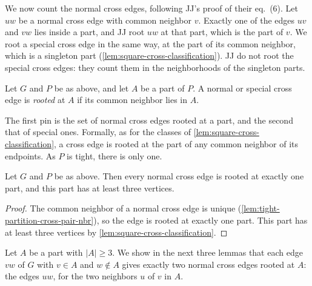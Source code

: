 We now count the normal cross edges, following JJ's proof of their
eq.~(6). Let $uw$ be a normal cross edge with common neighbor $v$.
Exactly one of the edges $uv$ and $vw$ lies inside a part, and JJ root
$uw$ at that part, which is the part of $v$. We root a special cross
edge in the same way, at the part of its common neighbor, which is a
singleton part (\cref{lem:square-cross-classification}). JJ do not root
the special cross edges: they count them in the neighborhoods of the
singleton parts.

\begin{definition}
  \label{def:rooted-cross-edges}
  \leanok
  Let $G$ and $P$ be as above, and let $A$ be a part of $P$. A normal or
  special cross edge is \emph{rooted} at $A$ if its common neighbor lies
  in $A$.
\end{definition}

\begin{fmlnote}
  The first pin is the set of normal cross edges rooted at a part, and
  the second that of special ones. Formally, as for the classes of
  \cref{lem:square-cross-classification}, a cross edge is rooted at the
  part of any common neighbor of its endpoints. As $P$ is tight, there
  is only one.
\end{fmlnote}

\begin{lemma}
  \label{lem:normal-cross-count-rooted}
  \leanok
  Let $G$ and $P$ be as above. Then every normal cross edge is rooted at
  exactly one part, and this part has at least three vertices.
\end{lemma}
\begin{proof}
  \leanok
  The common neighbor of a normal cross edge is unique
  (\cref{lem:tight-partition-cross-pair-nbr}), so the edge is rooted at
  exactly one part. This part has at least three vertices by
  \cref{lem:square-cross-classification}.
\end{proof}

Let $A$ be a part with $|A| \ge 3$. We show in the next three lemmas
that each edge $vw$ of $G$ with $v \in A$ and $w \notin A$ gives exactly
two normal cross edges rooted at $A$: the edges $uw$, for the two
neighbors $u$ of $v$ in $A$.

